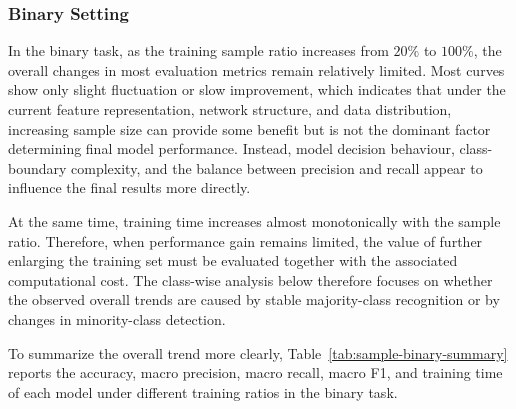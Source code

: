 \subsubsection{Binary Setting}

\par In the binary task, as the training sample ratio increases from $20\%$ to
$100\%$, the overall changes in most evaluation metrics remain relatively
limited. Most curves show only slight fluctuation or slow improvement, which
indicates that under the current feature representation, network structure, and
data distribution, increasing sample size can provide some benefit but is not
the dominant factor determining final model performance. Instead, model
decision behaviour, class-boundary complexity, and the balance between
precision and recall appear to influence the final results more directly.

\par At the same time, training time increases almost monotonically with the
sample ratio. Therefore, when performance gain remains limited, the value of
further enlarging the training set must be evaluated together with the
associated computational cost. The class-wise analysis below therefore focuses
on whether the observed overall trends are caused by stable majority-class
recognition or by changes in minority-class detection.

\par To summarize the overall trend more clearly,
Table~\ref{tab:sample-binary-summary} reports the accuracy, macro precision,
macro recall, macro F1, and training time of each model under different
training ratios in the binary task.

